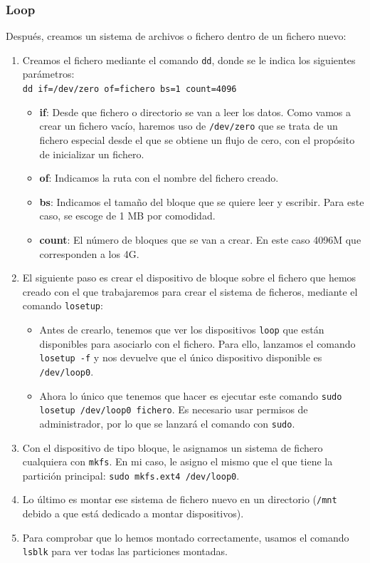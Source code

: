\documentclass[10pt]{article}
\begin{document}
	\subsubsection{Loop} \label{loop}
	Después, creamos un sistema de archivos o fichero dentro de un fichero nuevo:
	\begin{enumerate}
		\item Creamos el fichero mediante el comando \verb|dd|, donde se le indica los siguientes parámetros:\\
		\verb|dd if=/dev/zero of=fichero bs=1 count=4096|
		\begin{itemize}
			\item \textbf{if}: Desde que fichero o directorio se van a leer los datos. Como vamos a crear un fichero vacío, haremos uso de \verb|/dev/zero| que se trata de un fichero especial desde el que se obtiene un flujo de cero, con el propósito de inicializar un fichero.
			\item \textbf{of}: Indicamos la ruta con el nombre del fichero creado. 
			\item \textbf{bs}: Indicamos el tamaño del bloque que se quiere leer y escribir. Para este caso, se escoge de 1 MB por comodidad.
			\item \textbf{count}: El número de bloques que se van a crear. En este caso 4096M que corresponden a los 4G.
		\end{itemize}
		\item El siguiente paso es crear el dispositivo de bloque sobre el fichero que hemos creado con el que trabajaremos para crear el sistema de ficheros, mediante el comando \verb|losetup|:
		\begin{itemize}
			\item Antes de crearlo, tenemos que ver los dispositivos \verb|loop| que están disponibles para asociarlo con el fichero. Para ello, lanzamos el comando \verb|losetup -f| y nos devuelve que el único dispositivo disponible es \verb|/dev/loop0|.
			\item Ahora lo único que tenemos que hacer es ejecutar este comando \verb|sudo losetup /dev/loop0 fichero|. Es necesario usar permisos de administrador, por lo que se lanzará el comando con \verb|sudo|.
		\end{itemize}
		\item Con el dispositivo de tipo bloque, le asignamos un sistema de fichero cualquiera con \verb|mkfs|. En mi caso, le asigno el mismo que el que tiene la partición principal: \verb|sudo mkfs.ext4 /dev/loop0|.
		\item Lo último es montar ese sistema de fichero nuevo en un directorio (\verb|/mnt| debido a que está dedicado a montar dispositivos).
		\item Para comprobar que lo hemos montado correctamente, usamos el comando \verb|lsblk| para ver todas las particiones montadas.
	\end{enumerate}
\end{document}
